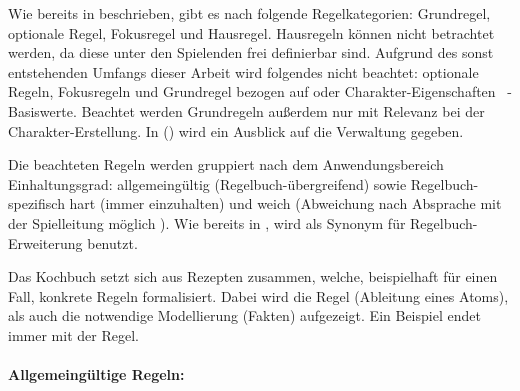 Wie bereits in  beschrieben, gibt es nach  folgende Regelkategorien: Grundregel, optionale Regel, Fokusregel und Hausregel.
Hausregeln können nicht betrachtet werden, da diese unter den Spielenden frei definierbar sind.
Aufgrund des sonst entstehenden Umfangs dieser Arbeit wird folgendes nicht beachtet: optionale Regeln, Fokusregeln und Grundregel bezogen auf  oder Charakter-Eigenschaften \bzw\ -Basiswerte.
Beachtet werden Grundregeln außerdem nur mit Relevanz bei der Charakter-Erstellung.
In  () wird ein Ausblick auf die Verwaltung gegeben.

Die beachteten Regeln werden gruppiert nach dem Anwendungsbereich \bzw Einhaltungsgrad: allgemeingültig (Regelbuch-übergreifend) sowie Regelbuch-spezifisch hart (immer einzuhalten) und weich (Abweichung nach Absprache mit der Spielleitung möglich ).
Wie bereits in , wird  als Synonym für Regelbuch-Erweiterung benutzt.

Das Kochbuch setzt sich aus Rezepten zusammen, welche, beispielhaft für einen Fall, konkrete Regeln formalisiert.
Dabei wird die Regel (Ableitung eines Atoms), als auch die notwendige Modellierung (Fakten) aufgezeigt.
Ein Beispiel endet immer mit der Regel.

\paragraph{Allgemeingültige Regeln:}\label{par:AR}


